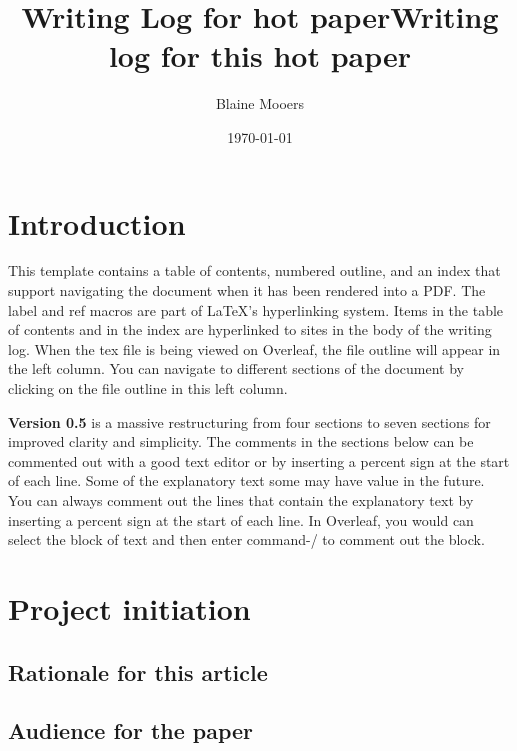 \documentclass[11pt,letterpaper]{article}
\title{Writing Log for hot paper}
\author{Blaine Mooers}
\date{\today}
\title{Writing log for this hot paper}
\begin{document}
\maketitle
\maketitle


\tableofcontents





\section{Introduction}
\label{sec:orgb8bc424}

This template contains a table of contents, numbered outline, and an
index that support navigating the document when it has been rendered
into a PDF. The label and ref macros are part of LaTeX's hyperlinking
system. Items in the table of contents and in the index are hyperlinked
to sites in the body of the writing log. When the tex file is being
viewed on Overleaf, the file outline will appear in the left column. You
can navigate to different sections of the document by clicking on the
file outline in this left column.

\textbf{Version 0.5} is a massive restructuring from four sections to seven sections
for improved clarity and simplicity. The comments in the sections below
can be commented out with
a good text editor or by inserting a percent sign at the start of each
line. Some of the explanatory text some may have value in the future.
You can always comment out the lines that contain the explanatory text
by inserting a percent sign at the start of each line. In Overleaf, you
would can select the block of text and then enter command-/ to comment
out the block.



\section{Project initiation}
\label{sec:org70645d4}


\subsection{Rationale for this article}
\label{sec:org725d5bf}

\subsection{Audience for the paper}
\label{sec:org0c20679}
\end{document}
